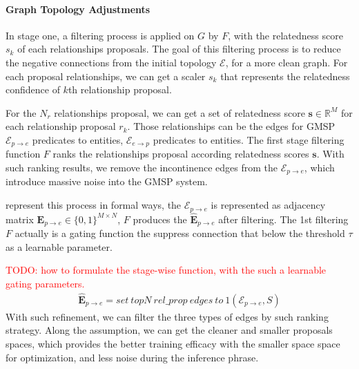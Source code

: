 \paragraph{Graph Topology Adjustments}
In stage one, a filtering process is applied on $G$ by $F$, with the relatedness score  $s_{k}$ of each relationships proposals.
The goal of this filtering process is to reduce the negative connections from the initial topology $\mathcal{E}$, for a more clean graph.
For each proposal relationships, we can get a scaler $s_{k}$ that represents the relatedness confidence of $k$th relationship proposal.

For the $N_r$ relationships proposal, we can get a set of relatedness score $\mathbf{s} \in \mathbb{R}^{M}$ for each relationship proposal $r_k$. 
Those relationships can be the edges for GMSP $\mathcal{E}_{p\rightarrow e}$ predicates to entities, $\mathcal{E}_{e\rightarrow p}$ predicates to entities.
The first stage filtering function $F$ ranks the relationships proposal according relatedness scores $\mathbf{s}$. 
With such ranking results, we remove the incontinence edges from the $\mathcal{E}_{p\rightarrow e}$, which introduce massive noise into the GMSP system.

represent this process in formal ways, the $\mathcal{E}_{p\rightarrow e}$ is represented as adjacency matrix $\mathbf{E}_{p\rightarrow e} \in \{0,1\}^{M \times N}$, $F$ produces the $\mathbf{\hat{E}}_{p\rightarrow e} $ after filtering. The 1st filtering $F$ actually is a gating function the suppress connection that below the threshold $\tau$ as a learnable parameter.

\textcolor{red}{TODO: how to formulate the stage-wise function, with the such a learnable gating parameters. }
\begin{align}
    \mathbf{\hat{E}}_{p\rightarrow e} = set~topN~rel\_prop~edges~to~1(\mathcal{E}_{p\rightarrow e}, S)
\end{align}
With such refinement, we can filter the three types of edges by such ranking strategy. 
Along the assumption, we can get the cleaner and smaller proposals spaces, which provides the better training efficacy with the smaller space space for optimization, and less noise during the inference phrase. 

